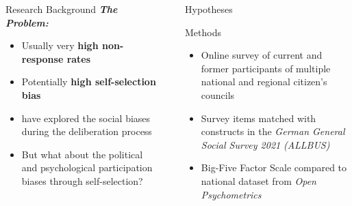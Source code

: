 \documentclass[final]{beamer}
\newlength{\sepwidth}
\newlength{\colwidth}
\newcommand{\separatorcolumn}{\begin{column}{\sepwidth}\end{column}}
\begin{document}
\begin{frame}[t]
\begin{columns}[t]
\begin{column}{\colwidth}
\begin{block}{Research Background}
\textit{\textbf{The Problem:}}

    \begin{itemize}
        \item Usually very \textbf{high non-response rates} \citep[e.g.,][]{dean2022CitizenDeliberation}
        \item Potentially \textbf{high self-selection bias}
    \end{itemize}


    \begin{itemize}
        \item \citet{luskin2022DeliberativeDistortions} have explored the social biases during the deliberation process
        \item  But what about the political and psychological participation biases through self-selection?
    \end{itemize}

  \end{block}
\end{column}
\separatorcolumn



\begin{column}{\colwidth}

  \begin{exampleblock}{Hypotheses}

    
  \end{exampleblock}


  \begin{block}{Methods}

    \vspace{-1ex}
    \begin{itemize}
        \item Online survey of current and former participants of multiple national and regional citizen's councils
        \item Survey items matched with constructs in the \textit{German General Social Survey 2021} \textit{(ALLBUS)} 
        \item Big-Five Factor Scale \citep{goldberg1992DevelopmentMarkers} compared to national dataset from \textit{Open Psychometrics}
    \end{itemize}
  \end{block}


\end{column}
\end{columns}
\end{frame}
\end{document}
